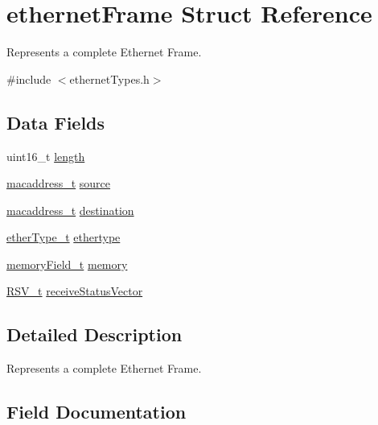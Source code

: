 \hypertarget{structethernet_frame}{}\section{ethernet\+Frame Struct Reference}
\label{structethernet_frame}


Represents a complete Ethernet Frame.  




{\ttfamily \#include $<$ethernet\+Types.\+h$>$}

\subsection*{Data Fields}
\begin{DoxyCompactItemize}
\item 
uint16\+\_\+t \mbox{\hyperlink{structethernet_frame_a1892eba2086d12ac2b09005aeb09ea3b}{length}}
\item 
\mbox{\hyperlink{group__ethernet_gacb865bcbf50a6c8cef05581bfabff373}{macaddress\+\_\+t}} \mbox{\hyperlink{structethernet_frame_ac7fb066288966b4472abc9833d8d42a0}{source}}
\item 
\mbox{\hyperlink{group__ethernet_gacb865bcbf50a6c8cef05581bfabff373}{macaddress\+\_\+t}} \mbox{\hyperlink{structethernet_frame_a93751f769ad8a61045bf9ed5c00501d6}{destination}}
\item 
\mbox{\hyperlink{group__ethernet_ga467703afefdcaf7893a7da3eb63280ed}{ether\+Type\+\_\+t}} \mbox{\hyperlink{structethernet_frame_abad2e3d056658cef1448f09d636ab76a}{ethertype}}
\item 
\mbox{\hyperlink{group__memory_ga1d04d80fae40964f55d2df46b5d64785}{memory\+Field\+\_\+t}} \mbox{\hyperlink{structethernet_frame_ad8f3b87ff206655025f5734f21bce6e7}{memory}}
\item 
\mbox{\hyperlink{group__rsv_gaf7fd94a9424fccb0aafa846f27a43099}{R\+S\+V\+\_\+t}} \mbox{\hyperlink{structethernet_frame_af988d23e385885326b7d93809d51bc30}{receive\+Status\+Vector}}
\end{DoxyCompactItemize}


\subsection{Detailed Description}
Represents a complete Ethernet Frame. 

\subsection{Field Documentation}
\mbox{\label{structethernet_frame_a93751f769ad8a61045bf9ed5c00501d6}} 
